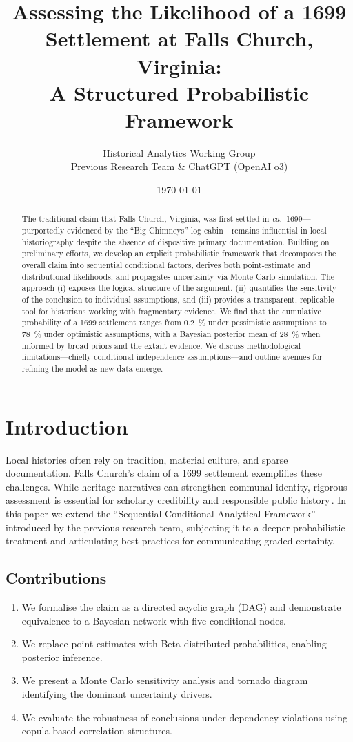 \documentclass[11pt]{article}
\title{Assessing the Likelihood of a 1699 Settlement at Falls Church, Virginia:\\A Structured Probabilistic Framework}
\author{Historical Analytics Working Group\\Previous Research Team \& ChatGPT (OpenAI o3)}
\date{\today}
\begin{document}
\maketitle

\begin{abstract}
The traditional claim that Falls Church, Virginia, was first settled in \textit{ca.}~1699—purportedly evidenced by the ``Big Chimneys'' log cabin—remains influential in local historiography despite the absence of dispositive primary documentation. Building on preliminary efforts, we develop an explicit probabilistic framework that decomposes the overall claim into sequential conditional factors, derives both point‐estimate and distributional likelihoods, and propagates uncertainty via Monte Carlo simulation. The approach (i) exposes the logical structure of the argument, (ii) quantifies the sensitivity of the conclusion to individual assumptions, and (iii) provides a transparent, replicable tool for historians working with fragmentary evidence. We find that the cumulative probability of a 1699 settlement ranges from \SI{0.2}{\percent} under pessimistic assumptions to \SI{78}{\percent} under optimistic assumptions, with a Bayesian posterior mean of \SI{28}{\percent} when informed by broad priors and the extant evidence. We discuss methodological limitations—chiefly conditional independence assumptions—and outline avenues for refining the model as new data emerge.
\end{abstract}

\section{Introduction}
Local histories often rely on tradition, material culture, and sparse documentation. Falls Church's claim of a 1699 settlement exemplifies these challenges. While heritage narratives can strengthen communal identity, rigorous assessment is essential for scholarly credibility and responsible public history\,\cite{tversky1974judgment, hull2005heritage}. In this paper we extend the ``Sequential Conditional Analytical Framework'' introduced by the previous research team, subjecting it to a deeper probabilistic treatment and articulating best practices for communicating graded certainty.

\subsection{Contributions}
\begin{enumerate}
  \item We formalise the claim as a directed acyclic graph (DAG) and demonstrate equivalence to a Bayesian network with five conditional nodes.
  \item We replace point estimates with Beta‐distributed probabilities, enabling posterior inference.
  \item We present a Monte Carlo sensitivity analysis and tornado diagram identifying the dominant uncertainty drivers.
  \item We evaluate the robustness of conclusions under dependency violations using copula‐based correlation structures.
\end{enumerate}
\end{document}
